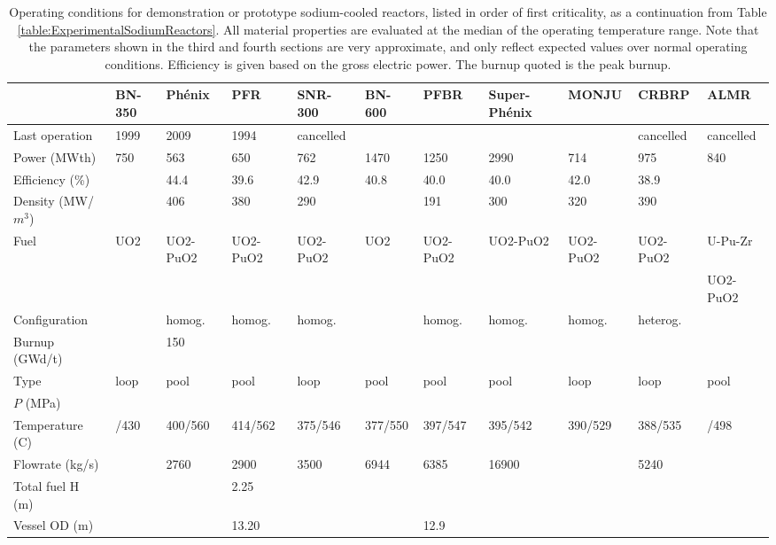 \documentclass[10pt]{article}
\numberwithin{equation}{section} %
\begin{document}
\clearpage
\begin{table}
\begin{table}[H]
\caption{Operating conditions for demonstration or prototype sodium-cooled reactors, listed in order of first criticality, as a continuation from Table \ref{table:ExperimentalSodiumReactors}. All material properties are evaluated at the median of the operating temperature range. Note that the parameters shown in the third and fourth sections are very approximate, and only reflect expected values over normal operating conditions. Efficiency is given based on the gross electric power. The burnup quoted is the peak burnup.}
\centering
\begin{tabular}{l l l l l l l l l l l}
\hline\hline
 								& BN-350		& Ph\'{e}nix		& PFR		& SNR-300	& BN-600		& PFBR		& Super-Ph\'{e}nix	& MONJU		& CRBRP		& ALMR\\ [0.5ex]
\hline
 Last operation						& 1999		& 2009			& 1994		& cancelled	& 			& 			& 				& 			& cancelled	& cancelled\\
 Power (MWth)						& 750		& 563			& 650		& 762		& 1470		& 1250		& 2990			& 714		& 975		& 840\\
 Efficiency (\%)						& 			& 44.4			& 39.6		& 42.9		& 40.8		& 40.0		& 40.0			& 42.0		& 38.9\\
 Density (MW/\(m^3\))				& 			& 406			& 380		& 290		& 			& 191		& 300			& 320		& 390\\
 \hdashline
 Fuel								& UO2 		& UO2-PuO2		& UO2-PuO2	& UO2-PuO2	& UO2		& UO2-PuO2	& UO2-PuO2		& UO2-PuO2	& UO2-PuO2	& U-Pu-Zr\\
								&			&				&			&			&			&			&				&			&			& UO2-PuO2\\
 Configuration						&			& homog.			& homog.		& homog.		&			& homog.		& homog.			& homog.		& heterog.\\
 Burnup (GWd/t)				& 			& 150 			& \\
 \hdashline
 Type							& loop		& pool			& pool		& loop		& pool		& pool		& pool			& loop		& loop		& pool\\
 \(P\) (MPa)						&			& 				& 			& 			&			& 			& \\
 Temperature (C)					& /430		& 400/560			& 414/562		& 375/546		& 377/550		& 397/547		& 395/542			& 390/529		& 388/535		& /498\\
 Flowrate (kg/s)						& 			& 2760			& 2900		& 3500		& 6944		& 6385		& 16900			&			& 5240\\
 \hdashline
 Total fuel H (m)					&			&				& 2.25\\
 Vessel OD (m)						&			&				& 13.20		&			&			& 12.9\\

\end{tabular}
\end{table}
\end{table}
\end{document}

